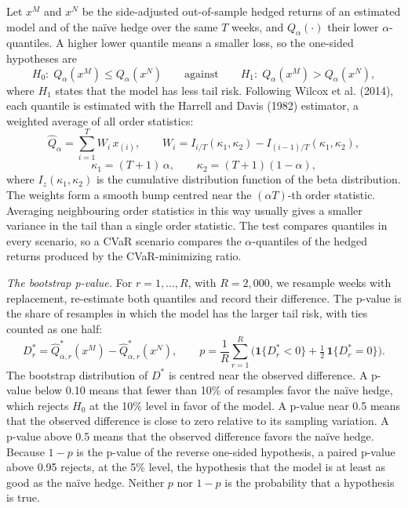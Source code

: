 \documentclass[11pt,letterpaper]{article}
\begin{document}
Let $x^M$ and $x^N$ be the side-adjusted out-of-sample hedged returns of an estimated model and of the naïve hedge over the same $T$ weeks, and $Q_\alpha(\cdot)$ their lower $\alpha$-quantiles. A higher lower quantile means a smaller loss, so the one-sided hypotheses are
\begin{equation}
H_0:\; Q_\alpha(x^M) \le Q_\alpha(x^N) \qquad\text{against}\qquad H_1:\; Q_\alpha(x^M) > Q_\alpha(x^N),
\end{equation}
where $H_1$ states that the model has less tail risk. Following Wilcox et al. (2014), each quantile is estimated with the Harrell and Davis (1982) estimator, a weighted average of all order statistics:
\begin{equation}
\hat Q_\alpha = \sum_{i=1}^{T} W_i\, x_{(i)}, \qquad W_i = I_{i/T}(\kappa_1, \kappa_2) - I_{(i-1)/T}(\kappa_1, \kappa_2),
\end{equation}
\begin{equation}
\kappa_1 = (T+1)\,\alpha, \qquad \kappa_2 = (T+1)(1-\alpha),
\end{equation}
where $I_z(\kappa_1, \kappa_2)$ is the cumulative distribution function of the beta distribution. The weights form a smooth bump centred near the $(\alpha T)$-th order statistic. Averaging neighbouring order statistics in this way usually gives a smaller variance in the tail than a single order statistic. The test compares quantiles in every scenario, so a CVaR scenario compares the $\alpha$-quantiles of the hedged returns produced by the CVaR-minimizing ratio.

\textit{The bootstrap p-value.} For $r = 1,\ldots,R$, with $R = 2{,}000$, we resample weeks with replacement, re-estimate both quantiles and record their difference. The p-value is the share of resamples in which the model has the larger tail risk, with ties counted as one half:
\begin{equation}
D^*_r = \hat Q^*_{\alpha,r}(x^M) - \hat Q^*_{\alpha,r}(x^N), \qquad p = \frac{1}{R}\sum_{r=1}^{R}\Big(\mathbf{1}\{D^*_r < 0\} + \tfrac12\,\mathbf{1}\{D^*_r = 0\}\Big).
\end{equation}
The bootstrap distribution of $D^*$ is centred near the observed difference. A p-value below 0.10 means that fewer than 10\% of resamples favor the naïve hedge, which rejects $H_0$ at the 10\% level in favor of the model. A p-value near 0.5 means that the observed difference is close to zero relative to its sampling variation. A p-value above 0.5 means that the observed difference favors the naïve hedge. Because $1-p$ is the p-value of the reverse one-sided hypothesis, a paired p-value above 0.95 rejects, at the 5\% level, the hypothesis that the model is at least as good as the naïve hedge. Neither $p$ nor $1-p$ is the probability that a hypothesis is true.
\end{document}
